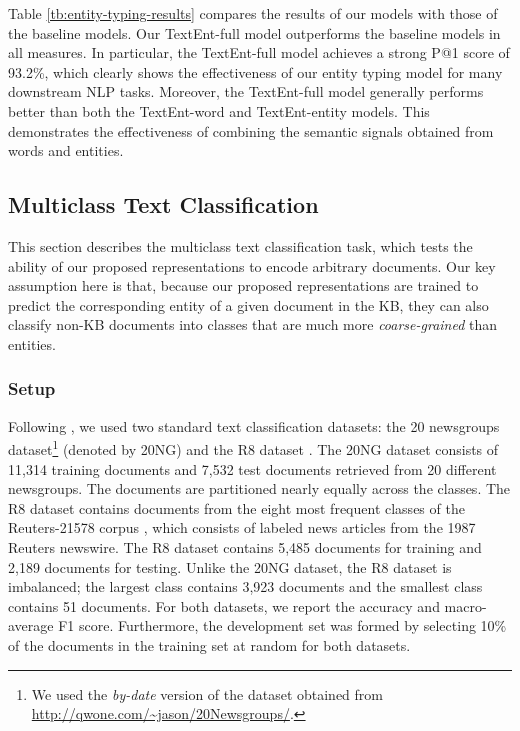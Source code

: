\documentclass[11pt]{article}
\begin{document}
  Table \ref{tb:entity-typing-results} compares the results of our models with those of the baseline models.
  Our TextEnt-full model outperforms the baseline models in all measures.
  In particular, the TextEnt-full model achieves a strong P@1 score of 93.2\%, which clearly shows the effectiveness of our entity typing model for many downstream NLP tasks.
  Moreover, the TextEnt-full model generally performs better than both the TextEnt-word and TextEnt-entity models.
  This demonstrates the effectiveness of combining the semantic signals obtained from words and entities.

  \subsection{Multiclass Text Classification}
  \label{subsec:text-classification}

  This section describes the multiclass text classification task, which tests the ability of our proposed representations to encode arbitrary documents.
  Our key assumption here is that, because our proposed representations are trained to predict the corresponding entity of a given document in the KB, they can also classify non-KB documents into classes that are much more \textit{coarse-grained} than entities.

  \subsubsection*{Setup}

  Following , we used two standard text classification datasets: the 20 newsgroups dataset\footnote{We used the \textit{by-date} version of the dataset obtained from \url{http://qwone.com/~jason/20Newsgroups/}.} (denoted by 20NG) \cite{Lang1995} and the R8 dataset \cite{Debole2005}.
  The 20NG dataset consists of 11,314 training documents and 7,532 test documents retrieved from 20 different newsgroups.
  The documents are partitioned nearly equally across the classes.
  The R8 dataset contains documents from the eight most frequent classes of the Reuters-21578 corpus \cite{Lewis1992}, which consists of labeled news articles from the 1987 Reuters newswire.
  The R8 dataset contains 5,485 documents for training and 2,189 documents for testing.
  Unlike the 20NG dataset, the R8 dataset is imbalanced; the largest class contains 3,923 documents and the smallest class contains 51 documents.
  For both datasets, we report the accuracy and macro-average F1 score.
  Furthermore, the development set was formed by selecting 10\% of the documents in the training set at random for both datasets.
\end{document}

